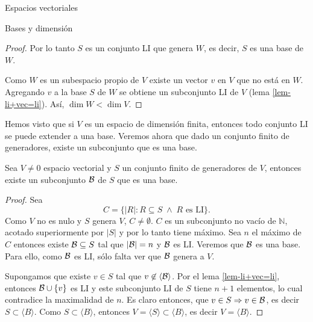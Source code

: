 \begin{chapter}{Espacios vectoriales}
\begin{section}{Bases y dimensi\'on}
\begin{proof}
        Por lo tanto $S$ es un conjunto LI  que genera $W$,  es decir, $S$  es una base de $W$. 
        
        Como $W$ es un subespacio propio de $V$ existe un vector $v$ en $V$ que
        no está en $W$. Agregando $v$ a la base $S$ de $W$ se obtiene un subconjunto
        LI de $V$ (lema \ref{lem-li+vec=li}). Así, $\dim W < \dim V$.
    \end{proof}

Hemos visto que si  $V$  es un espacio de dimensión finita,  entonces todo conjunto LI se puede extender a una base. Veremos ahora que dado un conjunto finito de generadores,  existe un subconjunto que es una base. 


\begin{teorema}\label{gen->base}
    Sea $V \ne 0$ espacio vectorial y $S$ un conjunto finito de generadores de $V$,  entonces existe un subconjunto $\mathcal{B}$  de $S$ que es una base.  
\end{teorema} 
\begin{proof}
    Sea
    $$
    C = \{|R|: R \subseteq S \;\wedge\; R \text{ es LI}\}.
    $$
    Como $V$ no es nulo  y $S$ genera $V$, $C \ne \emptyset$. $C$  es un subconjunto no vacío de  $\mathbb N$,  acotado superiormente por $|S|$ y por lo tanto tiene máximo. Sea $n$ el máximo de $C$ entonces existe  $\mathcal{B} \subseteq S$ tal que $|\mathcal{B}| =n$  y $\mathcal{B}$ es LI. Veremos que $\mathcal{B}$  es una base. Para ello, como $\mathcal{B} $ es LI, sólo falta ver que $\mathcal{B}$ genera a $V$. 
    
    Supongamos que existe $v \in S$ tal que $ v \not\in \langle \mathcal{B} \rangle$. Por el lema \ref{lem-li+vec=li},  entonces  $\mathcal{B} \cup \{v\}$ es LI y este subconjunto LI de $S$ tiene $n+1$  elementos, lo cual contradice la maximalidad de $n$. Es claro entonces, que $v \in S \Rightarrow v \in \mathcal{B}$,  es decir $S \subset \langle B \rangle$. Como $S \subset \langle B \rangle$,  entonces
    $V = \langle S \rangle \subset \langle B \rangle$, es decir $V =  \langle B \rangle$.
\end{proof}



\end{section}
\end{chapter}
